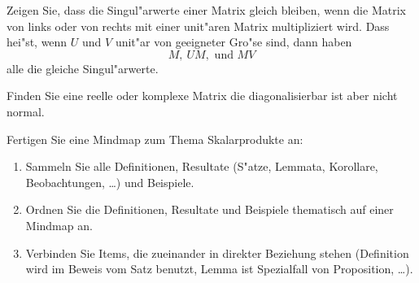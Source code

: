 \documentclass[a4,11pt]{article}
\begin{document}
\begin{aufgabe}[4 Punkte]
Zeigen Sie, dass die Singul"arwerte einer Matrix gleich bleiben, wenn
die Matrix von links oder von rechts mit einer unit"aren Matrix
multipliziert wird. Dass hei"st, wenn $U$ und $V$ unit"ar von
geeigneter Gro"se sind, dann haben
\[
M, \ UM, \text{ und } MV
\]
alle die gleiche Singul"arwerte.
\end{aufgabe}


\begin{aufgabe}[4 Punkte]
Finden Sie eine reelle oder komplexe Matrix die diagonalisierbar ist
aber nicht normal.
\end{aufgabe}

\begin{aufgabe}[4 Quizbonuspunkte]
  Fertigen Sie eine Mindmap zum Thema
  Skalarprodukte
  an:
  \begin{enumerate}
  \item Sammeln Sie alle Definitionen, Resultate (S"atze, Lemmata,
    Korollare, Beobachtungen, \ldots) und Beispiele.
  \item Ordnen Sie die Definitionen, Resultate und Beispiele
    thematisch auf einer Mindmap an.
  \item Verbinden Sie Items, die zueinander in direkter Beziehung
    stehen (Definition wird im Beweis vom Satz benutzt, Lemma ist
    Spezialfall von Proposition, \ldots).
  \end{enumerate}
\end{aufgabe}


\end{document}
